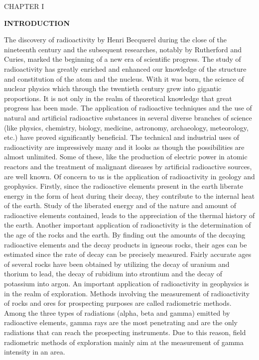 \topglue 0pt
\vskip 2cm
\centerline{CHAPTER I}
\vskip 2cm
\centerline{\bf INTRODUCTION}
\vskip 2cm
{\sc The discovery of} radioactivity by Henri Becquerel during the close of the nineteenth century and the subsequent researches, notably by Rutherford and Curies, marked the beginning of a new era of scientific progress.
The study of radioactivity has greatly enriched and enhanced our knowledge of the structure and constitution of the atom and the nucleus.
With it was born, the science of nuclear physics which through the twentieth century grew into gigantic proportions.
\smallskip
It is not only in the realm of theoretical knowledge that great progress has been made.
The application of radioactive techniques and the use of natural and artificial radioactive  substances in several diverse branches of science (like physics, chemistry, biology, medicine, astronomy, archaeology, meteorology, etc.) have proved significantly beneficial.
The technical and industrial uses of radioactivity are impressively many and it looks as though the possibilities are almost unlimited.
Some of these, like the production of electric power in atomic reactors and the treatment of malignant diseases by artificial radioactive sources, are well known.
\smallskip
Of concern to us is the application of radioactivity in geology and geophysics.
Firstly, since the radioactive elements present in the earth liberate energy in the form of heat during their decay, they contribute to the internal heat of the earth.
Study of the liberated energy and of the nature and amount of radioactive elements contained, leads to the appreciation of the thermal history of the earth.
Another important application of radioactivity is the determination of the age of the rocks and the earth.
By finding out the amounts of the decaying radioactive elements and the decay products in igneous rocks, their ages can be estimated since the rate of decay can be precisely measured.
Fairly accurate ages of several rocks have been obtained by utilizing the decay of uranium and thorium to lead, the decay of rubidium into strontium and the decay of potassium into argon.
\smallskip
An important application of radioactivity in geophysics is in the realm of exploration.
Methods involving the measurement of radioactivity of rocks and ores for prospecting purposes are called radiometric methods.
Among the three types of radiations (alpha, beta and gamma) emitted by radioactive elements, gamma rays are the most penetrating and are the only radiations that can reach the prospecting instruments.
Due to this reason, field radiometric methods of exploration mainly aim at the measurement of gamma intensity in an area.
